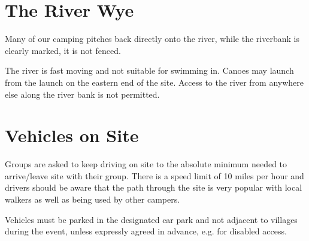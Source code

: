 \documentclass[a4paper, 11pt]{report}
\newcommand{\nl}{\newline}
\begin{document}
\section{The River Wye}
Many of our camping pitches back directly onto the river, while the riverbank is clearly marked, it is not fenced. \nl

The river is fast moving and not suitable for swimming in. Canoes may launch from the launch on the eastern end of the site. Access to the river from anywhere else along the river bank is not permitted. 

\section{Vehicles on Site}
Groups are asked to keep driving on site to the absolute minimum needed to arrive/leave site with their group.  There is a speed limit of 10 miles per hour and drivers should be aware that the path through the site is very popular with local walkers as well as being used by other campers.\nl

Vehicles must be parked in the designated car park and not adjacent to villages during the event, unless expressly agreed in advance, e.g. for disabled access.


\backPage
\end{document}
